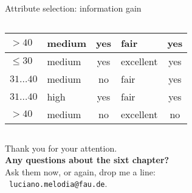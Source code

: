 \documentclass[aspectratio=169,t,table]{beamer}
\begin{document}
{\begin{frame}{Attribute selection: information gain}
\begin{columns}
\begin{column}{0.45\textwidth}
{\begin{tabular}{|l|l|c|l|c|}
            \cellcolor{yellow!20}$>40$ & \cellcolor{yellow!20}medium & \cellcolor{yellow!20}yes & \cellcolor{yellow!20}fair & \cellcolor{green!20}yes \\\hline
            \cellcolor{yellow!20}$\leq30$ & \cellcolor{yellow!20}medium & \cellcolor{yellow!20}yes & \cellcolor{yellow!20}excellent & \cellcolor{green!20}yes \\\hline
            \cellcolor{yellow!20}$31\ldots40$ & \cellcolor{yellow!20}medium & \cellcolor{yellow!20}no & \cellcolor{yellow!20}fair & \cellcolor{green!20}yes \\\hline
            \cellcolor{yellow!20}$31\ldots40$ & \cellcolor{yellow!20}high & \cellcolor{yellow!20}yes & \cellcolor{yellow!20}fair & \cellcolor{green!20}yes \\\hline
            \cellcolor{yellow!20}$>40$ & \cellcolor{yellow!20}medium & \cellcolor{yellow!20}no & \cellcolor{yellow!20}excellent & \cellcolor{red!20}no \\\hline
          \end{tabular}}
        \end{column}
      \end{columns}
    \end{frame}
  }

  { %
    \begin{frame}[c]
      \begin{center}
        Thank you for your attention.\\
        {\bf Any questions about the sixt chapter?}\\[0.5cm]
        Ask them now, or again, drop me a line: \\
        \faSendO \ \texttt{luciano.melodia@fau.de}.
      \end{center}
    \end{frame}
  }
\end{document}
